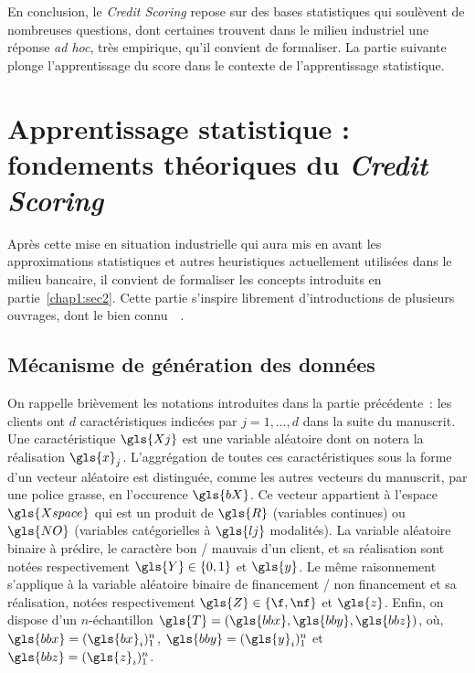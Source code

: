 \medskip

En conclusion, le \textit{Credit Scoring} repose sur des bases statistiques qui soulèvent de nombreuses questions, dont certaines trouvent dans le milieu industriel une réponse \textit{ad hoc}, très empirique, qu'il convient de formaliser. La partie suivante plonge l'apprentissage du \gls{score} dans le contexte de l'apprentissage statistique.

\section{Apprentissage statistique : fondements théoriques du \textit{Credit Scoring}} \label{chap1:sec3}

Après cette mise en situation industrielle qui aura mis en avant les approximations statistiques et autres heuristiques actuellement utilisées dans le milieu bancaire, il convient de formaliser les concepts introduits en partie~\ref{chap1:sec2}. Cette partie s'inspire librement d'introductions de plusieurs ouvrages, dont le bien connu~~\cite{friedman2001elements}.

\subsection{Mécanisme de génération des données}

On rappelle brièvement les notations introduites dans la partie précédente~: les clients ont $d$ caractéristiques indicées par $j = 1, \dots, d$ dans la suite du manuscrit. Une caractéristique $\gls{Xj}$ est une variable aléatoire dont on notera la réalisation $\gls{x}_j$. L'aggrégation de toutes ces caractéristiques sous la forme d'un vecteur aléatoire est distinguée, comme les autres vecteurs du manuscrit, par une police grasse, en l'occurence $\gls{bX}$. Ce vecteur appartient à l'espace $\gls{Xspace}$ qui est un produit de $\gls{R}$ (variables continues) ou $\gls{NO}$ (variables catégorielles à $\gls{lj}$ modalités). La variable aléatoire binaire à prédire, le caractère bon / mauvais d'un client, et sa réalisation sont notées respectivement $\gls{Y} \in \{0,1\}$ et $\gls{y}$. Le même raisonnement s'applique à la variable aléatoire binaire de financement / non financement et sa réalisation, notées respectivement $\gls{Z} \in \{\f,\nf\}$ et $\gls{z}$. Enfin, on dispose d'un $n$-échantillon $\gls{T} = (\gls{bbx},\gls{bby},\gls{bbz})$, où, $\gls{bbx} = (\gls{bx}_i)_1^n$, $\gls{bby} = (\gls{y}_i)_1^n$ et $\gls{bbz} = (\gls{z}_i)_1^n$.

